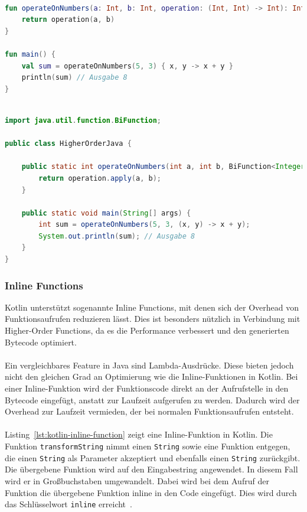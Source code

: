 \documentclass[11pt]{article}
\begin{document}
    \begin{lstlisting}[language=Kotlin, caption={HigherOrderKotlin.kt}, label={lst:kotlin-higher-order-function}]

fun operateOnNumbers(a: Int, b: Int, operation: (Int, Int) -> Int): Int {
    return operation(a, b)
}

fun main() {
    val sum = operateOnNumbers(5, 3) { x, y -> x + y }
    println(sum) // Ausgabe 8
}
    \end{lstlisting}

    \begin{lstlisting}[language=Java, caption={HigherOrderJava.java}, label={lst:java-higher-order-function}]

import java.util.function.BiFunction;

public class HigherOrderJava {

    public static int operateOnNumbers(int a, int b, BiFunction<Integer, Integer, Integer> operation) {
        return operation.apply(a, b);
    }

    public static void main(String[] args) {
        int sum = operateOnNumbers(5, 3, (x, y) -> x + y);
        System.out.println(sum); // Ausgabe 8
    }
}
    \end{lstlisting}

    \subsubsection{Inline Functions}
    Kotlin unterstützt sogenannte Inline Functions, mit denen sich der Overhead von Funktionsaufrufen reduzieren lässt.
    Dies ist besonders nützlich in Verbindung mit Higher-Order Functions, da es die Performance verbessert und den generierten Bytecode optimiert.\\
    \\
    Ein vergleichbares Feature in Java sind Lambda-Ausdrücke.
    Diese bieten jedoch nicht den gleichen Grad an Optimierung wie die Inline-Funktionen in Kotlin.
    Bei einer Inline-Funktion wird der Funktionscode direkt an der Aufrufstelle in den Bytecode eingefügt, anstatt zur Laufzeit aufgerufen zu werden.
    Dadurch wird der Overhead zur Laufzeit vermieden, der bei normalen Funktionsaufrufen entsteht.\\
    \\
    Listing~\ref{lst:kotlin-inline-function} zeigt eine Inline-Funktion in Kotlin.
    Die Funktion \texttt{transformString} nimmt einen \texttt{String} sowie eine Funktion entgegen, die einen \texttt{String} als Parameter akzeptiert und ebenfalls einen \texttt{String} zurückgibt.
    Die übergebene Funktion wird auf den Eingabestring angewendet.
    In diesem Fall wird er in Großbuchstaben umgewandelt.
    Dabei wird bei dem Aufruf der Funktion die übergebene Funktion inline in den Code eingefügt.
    Dies wird durch das Schlüsselwort \texttt{inline} erreicht~\cite{kotlin-inline}.\\
    \\
\end{document}
